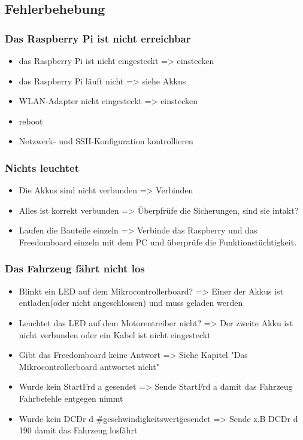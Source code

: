 \subsection{Fehlerbehebung}
\subsubsection{Das Raspberry Pi ist nicht erreichbar}
\begin{itemize}
\item das Raspberry Pi ist nicht eingesteckt => einstecken
\item das Raspberry Pi läuft nicht => siehe Akkus
\item WLAN-Adapter nicht eingesteckt => einstecken
\item reboot
\item Netzwerk- und SSH-Konfiguration kontrollieren
\end{itemize}
\subsubsection{Nichts leuchtet}
\begin{itemize}
\item Die Akkus sind nicht verbunden => Verbinden
\item Alles ist korrekt verbunden => Überpfrüfe die Sicherungen, sind sie intakt?
\item Laufen die Bauteile einzeln => Verbinde das Raspberry und das Freedomboard einzeln mit dem PC und überprüfe die Funktionstüchtigkeit.
\end{itemize}

\subsubsection{Das Fahrzeug fährt nicht los}
\begin{itemize}
\item Blinkt ein LED auf dem Mikrocontrollerboard? => Einer der Akkus ist entladen(oder nicht angeschlossen) und muss geladen werden
\item Leuchtet das LED auf dem Motorentreiber nicht? => Der zweite Akku ist nicht verbunden oder ein Kabel ist nicht eingesteckt
\item Gibt das Freedomboard keine Antwort => Siehe Kapitel "Das Mikrocontrollerboard antwortet nicht"
\item Wurde kein StartFrd a gesendet => Sende StartFrd a damit das Fahrzeug Fahrbefehle entgegen nimmt
\item Wurde kein DCDr d \"\#geschwindigkeitswert\" gesendet => Sende z.B DCDr d 190 damit das Fahrzeug losfährt
\end{itemize}

